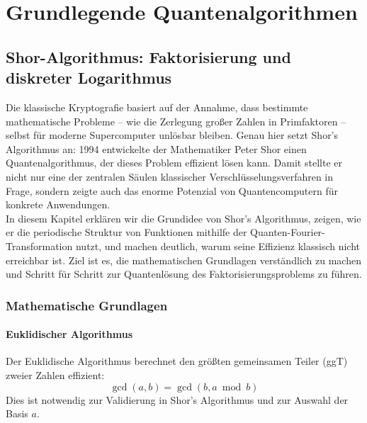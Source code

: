\chapter{Grundlegende Quantenalgorithmen}
\label{basic_algorithms} %




\section{Shor-Algorithmus: Faktorisierung und diskreter Logarithmus}
\label{first:shor-algorithm}
Die klassische Kryptografie basiert auf der Annahme, dass bestimmte mathematische Probleme – wie die Zerlegung großer Zahlen in Primfaktoren – selbst für moderne Supercomputer unlösbar bleiben. Genau hier setzt Shor’s Algorithmus an: 1994 entwickelte der Mathematiker Peter Shor einen Quantenalgorithmus, der dieses Problem effizient lösen kann. Damit stellte er nicht nur eine der zentralen Säulen klassischer Verschlüsselungsverfahren in Frage, sondern zeigte auch das enorme Potenzial von Quantencomputern für konkrete Anwendungen.\\

\noindent In diesem Kapitel erklären wir die Grundidee von Shor’s Algorithmus, zeigen, wie er die periodische Struktur von Funktionen mithilfe der Quanten-Fourier-Transformation nutzt, und machen deutlich, warum seine Effizienz klassisch nicht erreichbar ist. Ziel ist es, die mathematischen Grundlagen verständlich zu machen und Schritt für Schritt zur Quantenlösung des Faktorisierungsproblems zu führen.\\

\subsection{Mathematische Grundlagen}

\subsubsection*{Euklidischer Algorithmus}
Der Euklidische Algorithmus berechnet den größten gemeinsamen Teiler (ggT) zweier Zahlen effizient:
\[
\gcd(a, b) = \gcd(b, a \bmod b)
\]
Dies ist notwendig zur Validierung in Shor's Algorithmus und zur Auswahl der Basis \( a \).

